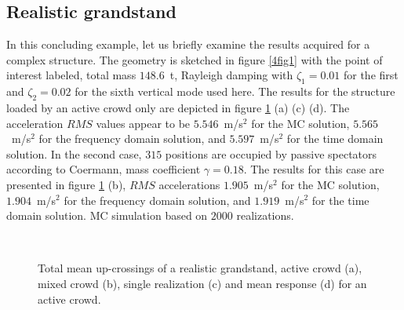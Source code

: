 \documentclass[preprint,12pt,authoryear]{elsarticle}
\begin{document}
\subsection{Realistic grandstand}
\label{grandstand}
In this concluding example, let us briefly examine the results acquired for a complex structure. The geometry is sketched in figure \ref{4fig1} with the point of interest labeled, total mass $148.6$~t, Rayleigh damping with $\zeta_1=0.01$ for the first and $\zeta_2=0.02$ for the sixth vertical mode used here. The results for the structure loaded by an active crowd only are depicted in figure \ref{4fig6} (a) (c) (d). The acceleration $RMS$ values appear to be $5.546$~m/s$^2$ for the MC solution, $5.565$~m/s$^2$ for the frequency domain solution, and $5.597$~m/s$^2$ for the time domain solution. In the second case, $315$ positions are occupied by passive spectators according to Coermann, mass coefficient $\gamma=0.18$. The results for this case are presented in figure \ref{4fig6} (b), $RMS$ accelerations $1.905$~m/s$^2$ for the MC solution, $1.904$~m/s$^2$ for the frequency domain solution, and $1.919$~m/s$^2$ for the time domain solution. MC simulation based on $2000$ realizations.
\begin{figure}
	\centering
{}
\\
	\caption{Total mean up-crossings of a realistic grandstand, active crowd (a), mixed crowd (b), single realization (c) and mean response (d) for an active crowd.}
	\label{4fig6}
\end{figure}
\end{document}
